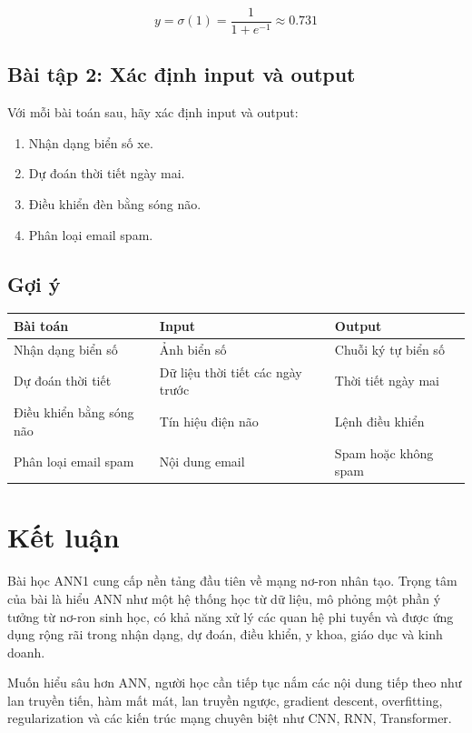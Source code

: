 \documentclass[12pt,a4paper]{report}
\begin{document}
\[
    y = \sigma(1)=\frac{1}{1+e^{-1}}\approx 0.731
\]

\section*{Bài tập 2: Xác định input và output}

Với mỗi bài toán sau, hãy xác định input và output:

\begin{enumerate}
    \item Nhận dạng biển số xe.
    \item Dự đoán thời tiết ngày mai.
    \item Điều khiển đèn bằng sóng não.
    \item Phân loại email spam.
\end{enumerate}

\section*{Gợi ý}

\begin{center}
\begin{tabular}{lll}
\toprule
Bài toán & Input & Output \\
\midrule
Nhận dạng biển số & Ảnh biển số & Chuỗi ký tự biển số \\
Dự đoán thời tiết & Dữ liệu thời tiết các ngày trước & Thời tiết ngày mai \\
Điều khiển bằng sóng não & Tín hiệu điện não & Lệnh điều khiển \\
Phân loại email spam & Nội dung email & Spam hoặc không spam \\
\bottomrule
\end{tabular}
\end{center}

\chapter*{Kết luận}

Bài học ANN1 cung cấp nền tảng đầu tiên về mạng nơ-ron nhân tạo. Trọng tâm của bài là hiểu ANN như một hệ thống học từ dữ liệu, mô phỏng một phần ý tưởng từ nơ-ron sinh học, có khả năng xử lý các quan hệ phi tuyến và được ứng dụng rộng rãi trong nhận dạng, dự đoán, điều khiển, y khoa, giáo dục và kinh doanh.

Muốn hiểu sâu hơn ANN, người học cần tiếp tục nắm các nội dung tiếp theo như lan truyền tiến, hàm mất mát, lan truyền ngược, gradient descent, overfitting, regularization và các kiến trúc mạng chuyên biệt như CNN, RNN, Transformer.
\end{document}
